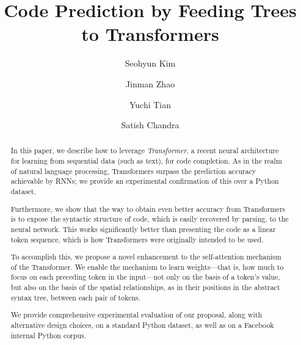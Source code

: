 \documentclass[nonacm, sigconf]{acmart}
\begin{document}
\title{Code Prediction by Feeding Trees to Transformers}

\author{Seohyun Kim}

\author{Jinman Zhao}
\authornotemark[1]

\author{Yuchi Tian}

\author{Satish Chandra}





\begin{abstract}
  In this paper, we describe how to leverage \emph{Transformer}, a recent neural  architecture for learning from sequential data (such as text), for code completion.  As in the realm of natural language processing, Transformers surpass the prediction accuracy achievable by RNNs; we provide an experimental confirmation of this over a Python dataset.
  
  Furthermore, we show that the way to obtain even better accuracy from Transformers is to expose the syntactic structure of code, which is easily recovered by parsing, to the neural network. This works significantly better than presenting the code as a linear token sequence, which is how Transformers were originally intended to be used.
  
  To accomplish this, we propose a novel enhancement to the self-attention mechanism of the Transformer.  We enable the mechanism to learn weights---that is, how much to focus on each preceding token in the input---not only on the basis of a token's value, but also on the basis of the spatial relationships, as in their positions in the abstract syntax tree, between each pair of tokens.
  
  We provide comprehensive experimental evaluation of our proposal, along with alternative design choices, on a standard Python dataset, as well as on a Facebook internal Python corpus.
  
\end{abstract}
\end{document}
